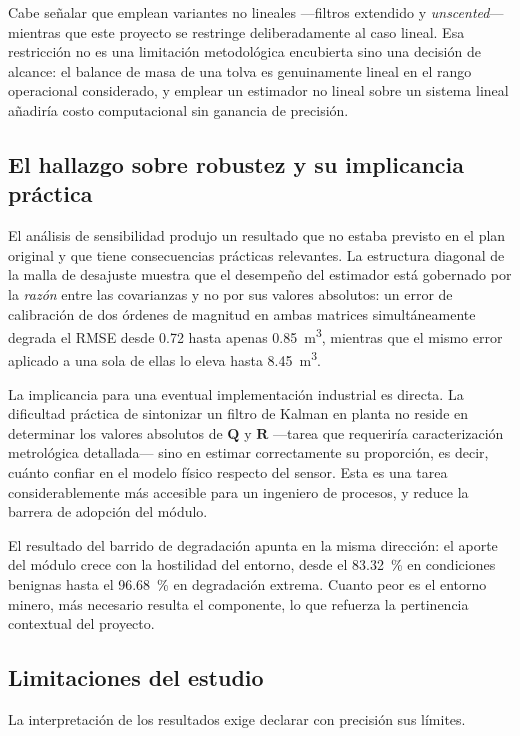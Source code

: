 Cabe señalar que \textcite{barzaga2025} emplean variantes no lineales —filtros
extendido y \emph{unscented}— mientras que este proyecto se restringe
deliberadamente al caso lineal. Esa restricción no es una limitación
metodológica encubierta sino una decisión de alcance: el balance de masa de una
tolva es genuinamente lineal en el rango operacional considerado, y emplear un
estimador no lineal sobre un sistema lineal añadiría costo computacional sin
ganancia de precisión.

\subsection{El hallazgo sobre robustez y su implicancia práctica}

El análisis de sensibilidad produjo un resultado que no estaba previsto en el
plan original y que tiene consecuencias prácticas relevantes. La estructura
diagonal de la malla de desajuste muestra que el desempeño del estimador está
gobernado por la \emph{razón} entre las covarianzas y no por sus valores
absolutos: un error de calibración de dos órdenes de magnitud en ambas matrices
simultáneamente degrada el RMSE desde \num{0,72} hasta apenas
\SI{0,85}{\metre\cubed}, mientras que el mismo error aplicado a una sola de
ellas lo eleva hasta \SI{8,45}{\metre\cubed}.

La implicancia para una eventual implementación industrial es directa. La
dificultad práctica de sintonizar un filtro de Kalman en planta no reside en
determinar los valores absolutos de $\mathbf{Q}$ y $\mathbf{R}$ —tarea que
requeriría caracterización metrológica detallada— sino en estimar correctamente
su proporción, es decir, cuánto confiar en el modelo físico respecto del sensor.
Esta es una tarea considerablemente más accesible para un ingeniero de procesos,
y reduce la barrera de adopción del módulo.

El resultado del barrido de degradación apunta en la misma dirección: el aporte
del módulo crece con la hostilidad del entorno, desde el
\SI{83,32}{\percent} en condiciones benignas hasta el \SI{96,68}{\percent} en
degradación extrema. Cuanto peor es el entorno minero, más necesario resulta el
componente, lo que refuerza la pertinencia contextual del proyecto.

\subsection{Limitaciones del estudio}

La interpretación de los resultados exige declarar con precisión sus límites.

